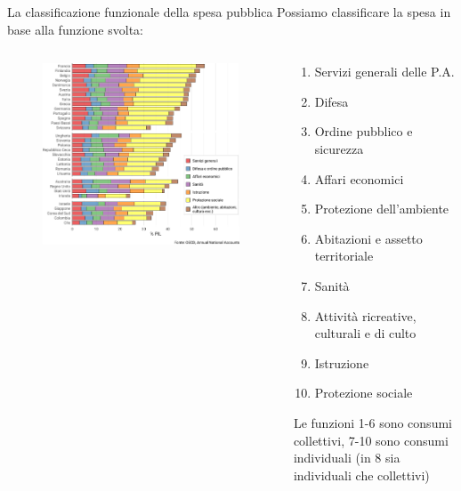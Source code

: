 \documentclass[aspectratio=149,11pt,italian]{beamer}
\begin{document}
\begin{frame}{La classificazione funzionale della spesa pubblica}
Possiamo classificare la spesa in base alla funzione svolta:

\begin{columns}
\begin{column}{.6\columnwidth}
\begin{figure}
\centering
\includegraphics[width=\textwidth]{./figure/spesa-pubblica-per-funzioni-2019-orizz-color.pdf}
\end{figure}
\end{column}

\begin{column}{.4\columnwidth}
\footnotesize
\begin{enumerate}
\item Servizi generali delle P.A.
\item Difesa
\item Ordine pubblico e sicurezza
\item Affari economici
\item Protezione dell’ambiente
\item Abitazioni e assetto territoriale
\item Sanità
\item Attività ricreative, culturali e di culto
\item Istruzione
\item Protezione sociale
\end{enumerate}
Le funzioni 1-6 sono consumi collettivi, 7-10 sono consumi individuali (in 8 sia individuali che collettivi)
\end{column}
\end{columns}
\end{frame}
\end{document}
